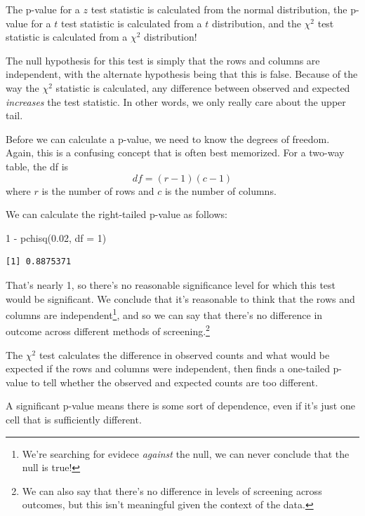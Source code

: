 \documentclass[
  letterpaper,
  DIV=11,
  numbers=noendperiod,
  oneside]{scrreprt}
\newenvironment{Shaded}{\begin{snugshade}}{\end{snugshade}}
\newcommand{\AttributeTok}[1]{\textcolor[rgb]{0.40,0.45,0.13}{#1}}
\newcommand{\DecValTok}[1]{\textcolor[rgb]{0.68,0.00,0.00}{#1}}
\newcommand{\FloatTok}[1]{\textcolor[rgb]{0.68,0.00,0.00}{#1}}
\newcommand{\FunctionTok}[1]{\textcolor[rgb]{0.28,0.35,0.67}{#1}}
\newcommand{\NormalTok}[1]{\textcolor[rgb]{0.00,0.23,0.31}{#1}}
\newcommand{\SpecialCharTok}[1]{\textcolor[rgb]{0.37,0.37,0.37}{#1}}
\begin{document}
The p-value for a \(z\) test statistic is calculated from the normal
distribution, the p-value for a \(t\) test statistic is calculated from
a \(t\) distribution, and the \(\chi^2\) test statistic is calculated
from a \(\chi^2\) distribution!

The null hypothesis for this test is simply that the rows and columns
are independent, with the alternate hypothesis being that this is false.
Because of the way the \(\chi^2\) statistic is calculated, any
difference between observed and expected \emph{increases} the test
statistic. In other words, we only really care about the upper tail.

Before we can calculate a p-value, we need to know the degrees of
freedom. Again, this is a confusing concept that is often best
memorized. For a two-way table, the df is \[
df = (r-1)(c-1)
\] where \(r\) is the number of rows and \(c\) is the number of columns.

We can calculate the right-tailed p-value as follows:

\begin{Shaded}
\begin{Highlighting}[]
\DecValTok{1} \SpecialCharTok{{-}} \FunctionTok{pchisq}\NormalTok{(}\FloatTok{0.02}\NormalTok{, }\AttributeTok{df =} \DecValTok{1}\NormalTok{)}
\end{Highlighting}
\end{Shaded}

\begin{verbatim}
[1] 0.8875371
\end{verbatim}

That's nearly 1, so there's no reasonable significance level for which
this test would be significant. We conclude that it's reasonable to
think that the rows and columns are independent\footnote{We're searching
  for evidece \emph{against} the null, we can never conclude that the
  null is true!}, and so we can say that there's no difference in
outcome across different methods of screening.\footnote{We can also say
  that there's no difference in levels of screening across outcomes, but
  this isn't meaningful given the context of the data.}

\begin{tcolorbox}[enhanced jigsaw, toprule=.15mm, colbacktitle=quarto-callout-note-color!10!white, title=\textcolor{quarto-callout-note-color}{\faInfo}\hspace{0.5em}{The \(\chi^2\) Test}, arc=.35mm, colframe=quarto-callout-note-color-frame, colback=white, titlerule=0mm, left=2mm, bottomtitle=1mm, bottomrule=.15mm, breakable, opacitybacktitle=0.6, leftrule=.75mm, toptitle=1mm, coltitle=black, rightrule=.15mm, opacityback=0]

The \(\chi^2\) test calculates the difference in observed counts and
what would be expected if the rows and columns were independent, then
finds a one-tailed p-value to tell whether the observed and expected
counts are too different.

A significant p-value means there is some sort of dependence, even if
it's just one cell that is sufficiently different.

\end{tcolorbox}
\end{document}
